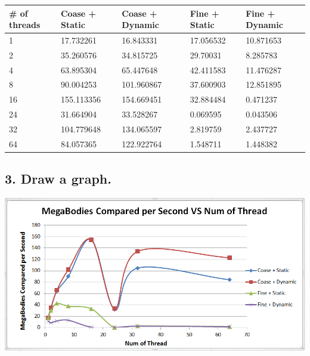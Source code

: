 \documentclass[a4paper,12pt]{article}
\begin{document}
\begin{tabular}{|l|l|l|l|l|}
\hline
\textbf{\# of threads} & \textbf{Coase + Static} & \textbf{Coase + Dynamic} & \textbf{Fine + Static} & \textbf{Fine + Dynamic} \\ \hline
1                      & 17.732261             & 16.843331              & 17.056532            & 10.871653             \\ \hline
2                      & 35.260576             & 34.815725              & 29.70031             & 8.285783              \\ \hline
4                      & 63.895304             & 65.447648              & 42.411583            & 11.476287             \\ \hline
8                      & 90.004253             & 101.960867             & 37.600903            & 12.851895             \\ \hline
16                     & 155.113356            & 154.669451             & 32.884484            & 0.471237              \\ \hline
24                     & 31.664904             & 33.528267              & 0.069595             & 0.043506              \\ \hline
32                     & 104.779648            & 134.065597             & 2.819759             & 2.437727              \\ \hline
64                     & 84.057365             & 122.922764             & 1.548711             & 1.448382              \\ \hline
\end{tabular}


\subsection*{3. Draw a graph. }

\includegraphics[width=6in]{3}
\end{document}
